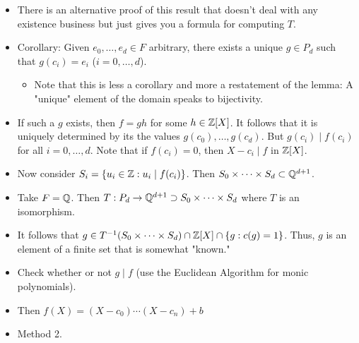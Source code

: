 \documentclass[../notes.tex]{subfiles}
\begin{document}
\begin{itemize}
    is an isomorphism of $F$-vector spaces.
    \begin{proof}
        $P_d$ and $F^{d+1}$ both have the same dimension. Thus, to prove bijectivity of this linear transformation, it will suffice to prove injectivity. To do so, we will show that $\ker(T)=\{0\}$. Let $g\in\ker(T)$ be arbitrary. Then
        \begin{align*}
            T(g) &= 0\\
            (g(c_0),\dots,g(c_d)) &= (0,\dots,0)
        \end{align*}
        Thus, $g$ has $d+1$ distinct roots $c_0,\dots,c_d$. It follows that $g\in((X-c_0)\dots(X-c_d))$, meaning that $g=0$ or $\deg(g)\geq d+1$. However, $g\in P_d$ by hypothesis as well, meaning $\deg(g)\leq d$. Therefore, $g=0$, as desired.
    \end{proof}
    \item There is an alternative proof of this result that doesn't deal with any existence business but just gives you a formula for computing $T$.
    \item Corollary: Given $e_0,\dots,e_d\in F$ arbitrary, there exists a unique $g\in P_d$ such that $g(c_i)=e_i$ ($i=0,\dots,d$).
    \begin{itemize}
        \item Note that this is less a corollary and more a restatement of the lemma: A "unique" element of the domain speaks to bijectivity.
    \end{itemize}
    \item If such a $g$ exists, then $f=gh$ for some $h\in\mathbb{Z}[X]$. It follows that it is uniquely determined by its the values $g(c_0),\dots,g(c_d)$. But $g(c_i)\mid f(c_i)$ for all $i=0,\dots,d$. Note that if $f(c_i)=0$, then $X-c_i\mid f$ in $\mathbb{Z}[X]$.
    \item Now consider $S_i=\{u_i\in\mathbb{Z}:u_i\mid f(c_i)\}$. Then $S_0\times\cdots\times S_d\subset\mathbb{Q}^{d+1}$.
    \item Take $F=\mathbb{Q}$. Then $T:P_d\to\mathbb{Q}^{d+1}\supset S_0\times\cdots\times S_d$ where $T$ is an isomorphism.
    \item It follows that $g\in T^{-1}(S_0\times\cdots\times S_d)\cap\mathbb{Z}[X]\cap\{g:c(g)=1\}$. Thus, $g$ is an element of a finite set that is somewhat "known."
    \item Check whether or not $g\mid f$ (use the Euclidean Algorithm for monic polynomials).
    \item Then $f(X)=(X-c_0)\cdots(X-c_n)+b$
    \item Method 2.

\end{itemize}
\end{document}
